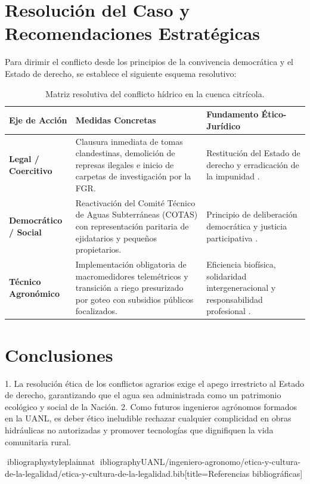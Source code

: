 \documentclass[spanish,letterpaper,oneside]{article}
\begin{document}
\section{Resolución del Caso y Recomendaciones Estratégicas}
Para dirimir el conflicto desde los principios de la convivencia democrática y el Estado de derecho, se establece el siguiente esquema resolutivo:

\begin{table}[htbp]
\centering
\small
\caption{Matriz resolutiva del conflicto hídrico en la cuenca citrícola.}
\label{tab:resolucion-agua}
\begin{tabularx}{\textwidth}{@{}l Y Y@{}}
\toprule
\textbf{Eje de Acción} & \textbf{Medidas Concretas} & \textbf{Fundamento Ético-Jurídico} \\
\midrule
\textbf{Legal / Coercitivo} & Clausura inmediata de tomas clandestinas, demolición de represas ilegales e inicio de carpetas de investigación por la FGR. & Restitución del Estado de derecho y erradicación de la impunidad \parencite{cndh2020}. \\
\addlinespace
\textbf{Democrático / Social} & Reactivación del Comité Técnico de Aguas Subterráneas (COTAS) con representación paritaria de ejidatarios y pequeños propietarios. & Principio de deliberación democrática y justicia participativa \parencite{cortina2013}. \\
\addlinespace
\textbf{Técnico Agronómico} & Implementación obligatoria de macromedidores telemétricos y transición a riego presurizado por goteo con subsidios públicos focalizados. & Eficiencia biofísica, solidaridad intergeneracional y responsabilidad profesional \parencite{uanl_codigo2021}. \\
\bottomrule
\end{tabularx}
\end{table}

\section{Conclusiones}
1. La resolución ética de los conflictos agrarios exige el apego irrestricto al Estado de derecho, garantizando que el agua sea administrada como un patrimonio ecológico y social de la Nación.
2. Como futuros ingenieros agrónomos formados en la UANL, es deber ético ineludible rechazar cualquier complicidad en obras hidráulicas no autorizadas y promover tecnologías que dignifiquen la vida comunitaria rural.

\newpage
ibliographystyle{plainnat}
ibliography{UANL/ingeniero-agronomo/etica-y-cultura-de-la-legalidad/etica-y-cultura-de-la-legalidad.bib}[title={Referencias bibliográficas}]
\end{document}
